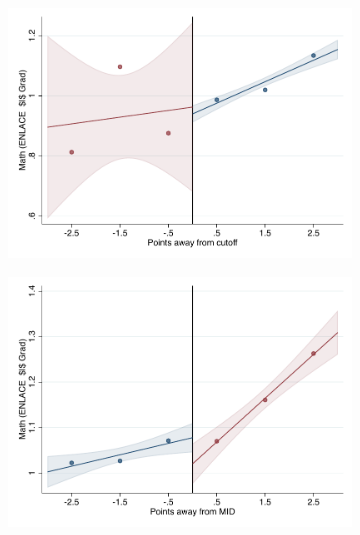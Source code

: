 \documentclass[oneside,11pt]{article}
\begin{document}
\begin{figure}[H]
\begin{center}
    \begin{subfigure}{0.475\textwidth}
        \centering
        \includegraphics[width=\textwidth]{04_Figures/rd_plot_tau_p_mat_3_IPN3.pdf}
    \end{subfigure}
    \begin{subfigure}{0.475\textwidth}
        \centering
        \includegraphics[width=\textwidth]{04_Figures/rd_plot_mid_p_mat_3_IPN3.pdf}
    \end{subfigure}


\end{center}
\end{figure}
\end{document}
